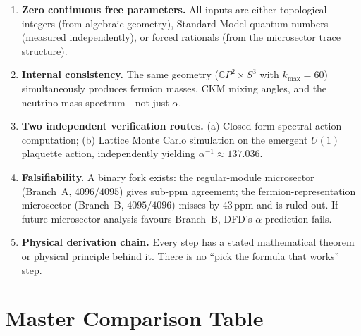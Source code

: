 \documentclass[11pt,a4paper]{article}
\begin{document}
\begin{tcolorbox}[colback=blue!5!white, colframe=blue!50!black, title=Why DFD Is Not Numerology]
\begin{enumerate}[nosep]
\item \textbf{Zero continuous free parameters.}  All inputs are either topological integers (from algebraic geometry), Standard Model quantum numbers (measured independently), or forced rationals (from the microsector trace structure).
\item \textbf{Internal consistency.}  The same geometry ($\mathbb{C}P^2\times S^3$ with $k_{\max}=60$) simultaneously produces fermion masses, CKM mixing angles, and the neutrino mass spectrum---not just $\alpha$.
\item \textbf{Two independent verification routes.}  (a) Closed-form spectral action computation; (b) Lattice Monte Carlo simulation on the emergent $U(1)$ plaquette action, independently yielding $\alpha^{-1}\approx 137.036$.
\item \textbf{Falsifiability.}  A binary fork exists: the regular-module microsector (Branch~A, $4096/4095$) gives sub-ppm agreement; the fermion-representation microsector (Branch~B, $4095/4096$) misses by 43\,ppm and is ruled out.  If future microsector analysis favours Branch~B, DFD's $\alpha$ prediction fails.
\item \textbf{Physical derivation chain.}  Every step has a stated mathematical theorem or physical principle behind it.  There is no ``pick the formula that works'' step.
\end{enumerate}
\end{tcolorbox}

\section{Master Comparison Table}\label{sec:table}
\end{document}
